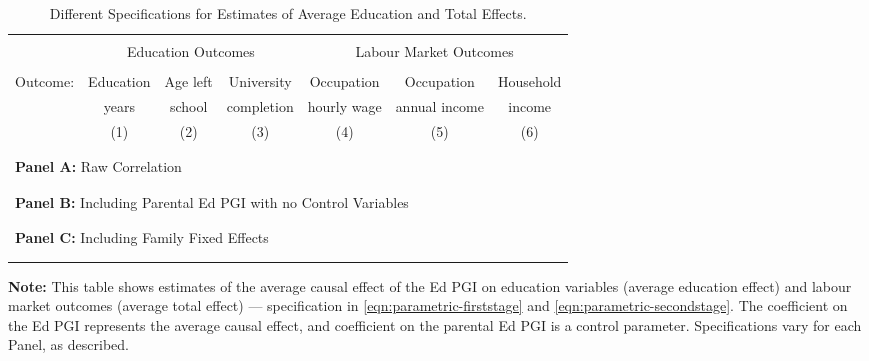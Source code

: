 \begin{table}[!h]
    \singlespacing
    \centering\newpage
    \caption{Different Specifications for Estimates of Average Education and Total Effects.}
    \small
    \begin{tabular}{l c c c c c c}
        \\[-1.8ex]\hline \hline \\[-1.8ex] 
        & \multicolumn{3}{c}{Education Outcomes}
            & \multicolumn{3}{c}{Labour Market Outcomes} \\ \\
        Outcome:
        & Education & Age left & University & Occupation  & Occupation    & Household \\
        & years     & school & completion & hourly wage & annual income & income    \\
        \cmidrule(lr){2-4} \cmidrule(lr){5-7}
        & (1) & (2) & (3) & (4) & (5) & (6) \\
        \\[-1.8ex]\hline \\[-1.8ex]
        \multicolumn{7}{l}{\textbf{Panel A:}
            Raw Correlation} \\
        
        \\[-1.8ex]\hline \\[-1.8ex]
        \multicolumn{7}{l}{\textbf{Panel B:}
            Including Parental Ed PGI with no Control Variables} \\
        
        \\[-1.8ex]\hline \\[-1.8ex]
        \multicolumn{7}{l}{\textbf{Panel C:}
            Including Family Fixed Effects} \\
        
        \\[-1.8ex]\hline \\[-1.8ex]
    \end{tabular}
    \label{tab:genetic-robust}
    \justify
    \footnotesize
    \textbf{Note:}
    This table shows estimates of the average causal effect of the Ed PGI on education variables (average education effect) and labour market outcomes (average total effect) --- specification in \autoref{eqn:parametric-firststage} and \eqref{eqn:parametric-secondstage}.
    The coefficient on the Ed PGI represents the average causal effect, and coefficient on the parental Ed PGI is a control parameter.
    Specifications vary for each Panel, as described.
\end{table}


